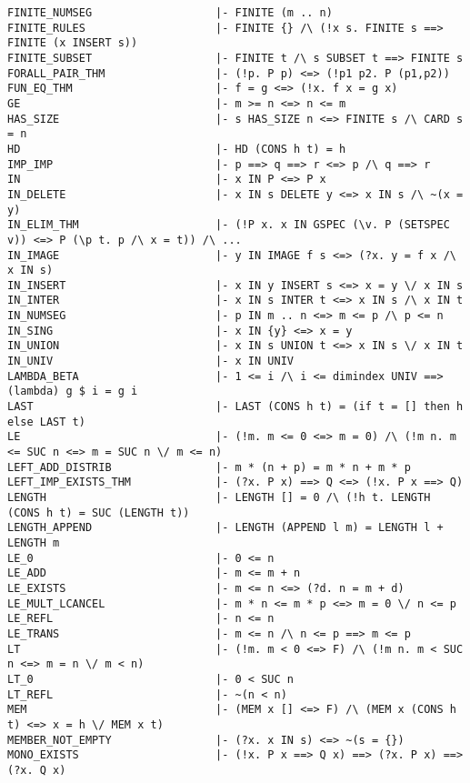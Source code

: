 \documentclass{llncs}
\begin{document}
\begin{verbatim}
FINITE_NUMSEG                   |- FINITE (m .. n)
FINITE_RULES                    |- FINITE {} /\ (!x s. FINITE s ==> FINITE (x INSERT s))
FINITE_SUBSET                   |- FINITE t /\ s SUBSET t ==> FINITE s
FORALL_PAIR_THM                 |- (!p. P p) <=> (!p1 p2. P (p1,p2))
FUN_EQ_THM                      |- f = g <=> (!x. f x = g x)
GE                              |- m >= n <=> n <= m
HAS_SIZE                        |- s HAS_SIZE n <=> FINITE s /\ CARD s = n
HD                              |- HD (CONS h t) = h
IMP_IMP                         |- p ==> q ==> r <=> p /\ q ==> r
IN                              |- x IN P <=> P x
IN_DELETE                       |- x IN s DELETE y <=> x IN s /\ ~(x = y)
IN_ELIM_THM                     |- (!P x. x IN GSPEC (\v. P (SETSPEC v)) <=> P (\p t. p /\ x = t)) /\ ...
IN_IMAGE                        |- y IN IMAGE f s <=> (?x. y = f x /\ x IN s)
IN_INSERT                       |- x IN y INSERT s <=> x = y \/ x IN s
IN_INTER                        |- x IN s INTER t <=> x IN s /\ x IN t
IN_NUMSEG                       |- p IN m .. n <=> m <= p /\ p <= n
IN_SING                         |- x IN {y} <=> x = y
IN_UNION                        |- x IN s UNION t <=> x IN s \/ x IN t
IN_UNIV                         |- x IN UNIV
LAMBDA_BETA                     |- 1 <= i /\ i <= dimindex UNIV ==> (lambda) g $ i = g i
LAST                            |- LAST (CONS h t) = (if t = [] then h else LAST t)
LE                              |- (!m. m <= 0 <=> m = 0) /\ (!m n. m <= SUC n <=> m = SUC n \/ m <= n)
LEFT_ADD_DISTRIB                |- m * (n + p) = m * n + m * p
LEFT_IMP_EXISTS_THM             |- (?x. P x) ==> Q <=> (!x. P x ==> Q)
LENGTH                          |- LENGTH [] = 0 /\ (!h t. LENGTH (CONS h t) = SUC (LENGTH t))
LENGTH_APPEND                   |- LENGTH (APPEND l m) = LENGTH l + LENGTH m
LE_0                            |- 0 <= n
LE_ADD                          |- m <= m + n
LE_EXISTS                       |- m <= n <=> (?d. n = m + d)
LE_MULT_LCANCEL                 |- m * n <= m * p <=> m = 0 \/ n <= p
LE_REFL                         |- n <= n
LE_TRANS                        |- m <= n /\ n <= p ==> m <= p
LT                              |- (!m. m < 0 <=> F) /\ (!m n. m < SUC n <=> m = n \/ m < n)
LT_0                            |- 0 < SUC n
LT_REFL                         |- ~(n < n)
MEM                             |- (MEM x [] <=> F) /\ (MEM x (CONS h t) <=> x = h \/ MEM x t)
MEMBER_NOT_EMPTY                |- (?x. x IN s) <=> ~(s = {})
MONO_EXISTS                     |- (!x. P x ==> Q x) ==> (?x. P x) ==> (?x. Q x)

\end{verbatim}
\end{document}
